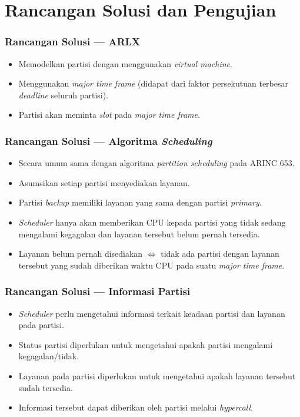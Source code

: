 \documentclass[xetex]{beamer}
\begin{document}
\section{Rancangan Solusi dan Pengujian}
\begin{frame}
	\frametitle{Rancangan Solusi --- ARLX}
	\begin{itemize}
		\item Memodelkan partisi dengan menggunakan \textit{virtual machine}.
		\item Menggunakan \textit{major time frame} (didapat dari faktor persekutuan
			terbesar \textit{deadline} seluruh partisi).
		\item Partisi akan meminta \textit{slot} pada \textit{major time frame}.
	\end{itemize}
\end{frame}
\begin{frame}
	\frametitle{Rancangan Solusi --- Algoritma \textit{Scheduling}}
	\begin{itemize}
		\item Secara umum sama dengan algoritma \textit{partition scheduling} pada ARINC 653.
		\item Asumsikan setiap partisi menyediakan layanan.
		\item Partisi \textit{backup} memiliki layanan yang sama dengan partisi \textit{primary}.
		\item \textit{Scheduler} hanya akan memberikan CPU kepada
			partisi yang tidak sedang mengalami kegagalan
			dan layanan tersebut belum pernah tersedia.
		\item Layanan belum pernah disediakan
			$\Longleftrightarrow$ tidak ada partisi dengan layanan
			tersebut yang sudah diberikan waktu CPU pada suatu
			\textit{major time frame}.
	\end{itemize}
\end{frame}
\begin{frame}
	\frametitle{Rancangan Solusi --- Informasi Partisi}
	\begin{itemize}
		\item \textit{Scheduler} perlu mengetahui informasi terkait keadaan partisi dan layanan pada partisi.
		\item Status partisi diperlukan untuk mengetahui apakah partisi mengalami kegagalan/tidak.
		\item Layanan pada partisi diperlukan untuk mengetahui apakah layanan tersebut sudah tersedia.
		\item Informasi tersebut dapat diberikan oleh partisi melalui \textit{hypercall}.
	\end{itemize}
\end{frame}
\end{document}
